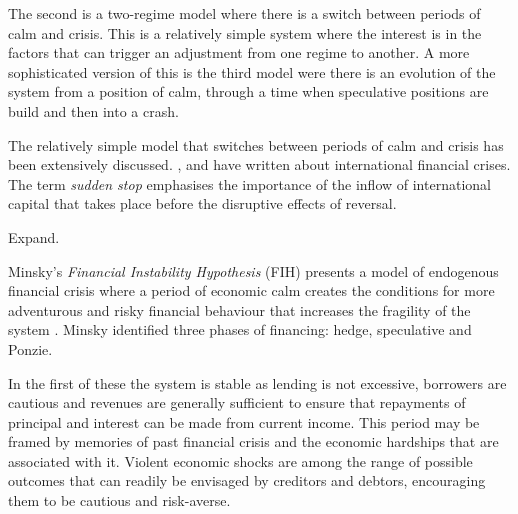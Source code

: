 \documentclass[12pt, a4paper, oneside]{article} %
\begin{document}
The second is a two-regime model where there is a switch between periods of calm and crisis.  This is  a relatively simple system where the interest is in the factors that can trigger an adjustment from one regime to another.  A more sophisticated version of this is the third model were there is an evolution of the system from a position of calm, through a time when speculative positions are build and then into a crash. 

The relatively simple model that switches between periods of calm and crisis has been extensively discussed. \citet{DornbuschSS}, \citet{CalvoSS} and \citet{KrugmanSS} have written about international financial crises.  The term \emph{sudden stop} emphasises the importance of the inflow of international capital that takes place before the disruptive effects of reversal.  

Expand.


Minsky's \emph{Financial Instability Hypothesis} (FIH) presents a model of endogenous financial crisis where a period of economic calm creates the conditions for more adventurous and risky financial behaviour that increases the fragility of the system \citet{MinskyStabilising, MinskyKeynes, MinskyFIH, MinskyLongerWaves}.  Minsky identified three phases of financing:  hedge, speculative and Ponzie.  

In the first of these the system is stable as lending is not excessive, borrowers are cautious and revenues are generally sufficient to ensure that repayments of principal and interest can be made from current income.  This period may be framed by memories of past financial crisis and the economic hardships that are associated with it.  Violent economic shocks are among the range of possible outcomes that can readily be envisaged by creditors and debtors, encouraging them to be cautious and risk-averse. 
\end{document}
